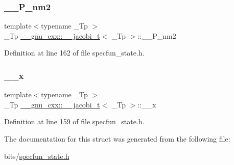 \subsubsection{\texorpdfstring{\+\_\+\+\_\+\+P\+\_\+nm2}{\_\_P\_nm2}}
{\footnotesize\ttfamily template$<$typename \+\_\+\+Tp $>$ \\
\+\_\+\+Tp \hyperlink{struct____gnu__cxx_1_1____jacobi__t}{\+\_\+\+\_\+gnu\+\_\+cxx\+::\+\_\+\+\_\+jacobi\+\_\+t}$<$ \+\_\+\+Tp $>$\+::\+\_\+\+\_\+\+P\+\_\+nm2}



Definition at line 162 of file specfun\+\_\+state.\+h.

\mbox{\label{struct____gnu__cxx_1_1____jacobi__t_aa3213c7241c094633f0be6f210b04e17}} 
\subsubsection{\texorpdfstring{\+\_\+\+\_\+x}{\_\_x}}
{\footnotesize\ttfamily template$<$typename \+\_\+\+Tp $>$ \\
\+\_\+\+Tp \hyperlink{struct____gnu__cxx_1_1____jacobi__t}{\+\_\+\+\_\+gnu\+\_\+cxx\+::\+\_\+\+\_\+jacobi\+\_\+t}$<$ \+\_\+\+Tp $>$\+::\+\_\+\+\_\+x}



Definition at line 159 of file specfun\+\_\+state.\+h.



The documentation for this struct was generated from the following file\+:\begin{DoxyCompactItemize}
\item 
bits/\hyperlink{specfun__state_8h}{specfun\+\_\+state.\+h}\end{DoxyCompactItemize}
